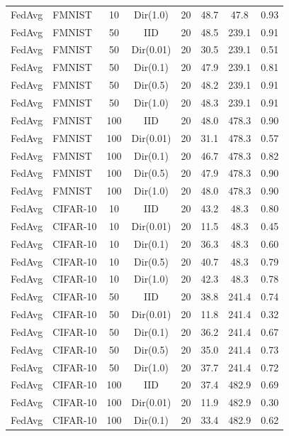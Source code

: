 \begin{table}[t]
\begin{tabular}{llcccccc}
FedAvg & FMNIST   &  10 & Dir(1.0)  & 20 &  48.7 &   47.8 & 0.93 \\
FedAvg & FMNIST   &  50 & IID       & 20 &  48.5 &  239.1 & 0.91 \\
FedAvg & FMNIST   &  50 & Dir(0.01) & 20 &  30.5 &  239.1 & 0.51 \\
FedAvg & FMNIST   &  50 & Dir(0.1)  & 20 &  47.9 &  239.1 & 0.81 \\
FedAvg & FMNIST   &  50 & Dir(0.5)  & 20 &  48.2 &  239.1 & 0.91 \\
FedAvg & FMNIST   &  50 & Dir(1.0)  & 20 &  48.3 &  239.1 & 0.91 \\
FedAvg & FMNIST   & 100 & IID       & 20 &  48.0 &  478.3 & 0.90 \\
FedAvg & FMNIST   & 100 & Dir(0.01) & 20 &  31.1 &  478.3 & 0.57 \\
FedAvg & FMNIST   & 100 & Dir(0.1)  & 20 &  46.7 &  478.3 & 0.82 \\
FedAvg & FMNIST   & 100 & Dir(0.5)  & 20 &  47.9 &  478.3 & 0.90 \\
FedAvg & FMNIST   & 100 & Dir(1.0)  & 20 &  48.0 &  478.3 & 0.90 \\
\midrule
FedAvg & CIFAR-10 &  10 & IID       & 20 &  43.2 &   48.3 & 0.80 \\
FedAvg & CIFAR-10 &  10 & Dir(0.01) & 20 &  11.5 &   48.3 & 0.45 \\
FedAvg & CIFAR-10 &  10 & Dir(0.1)  & 20 &  36.3 &   48.3 & 0.60 \\
FedAvg & CIFAR-10 &  10 & Dir(0.5)  & 20 &  40.7 &   48.3 & 0.79 \\
FedAvg & CIFAR-10 &  10 & Dir(1.0)  & 20 &  42.3 &   48.3 & 0.78 \\
FedAvg & CIFAR-10 &  50 & IID       & 20 &  38.8 &  241.4 & 0.74 \\
FedAvg & CIFAR-10 &  50 & Dir(0.01) & 20 &  11.8 &  241.4 & 0.32 \\
FedAvg & CIFAR-10 &  50 & Dir(0.1)  & 20 &  36.2 &  241.4 & 0.67 \\
FedAvg & CIFAR-10 &  50 & Dir(0.5)  & 20 &  35.0 &  241.4 & 0.73 \\
FedAvg & CIFAR-10 &  50 & Dir(1.0)  & 20 &  37.7 &  241.4 & 0.72 \\
FedAvg & CIFAR-10 & 100 & IID       & 20 &  37.4 &  482.9 & 0.69 \\
FedAvg & CIFAR-10 & 100 & Dir(0.01) & 20 &  11.9 &  482.9 & 0.30 \\
FedAvg & CIFAR-10 & 100 & Dir(0.1)  & 20 &  33.4 &  482.9 & 0.62 \\

\end{tabular}
\end{table}
